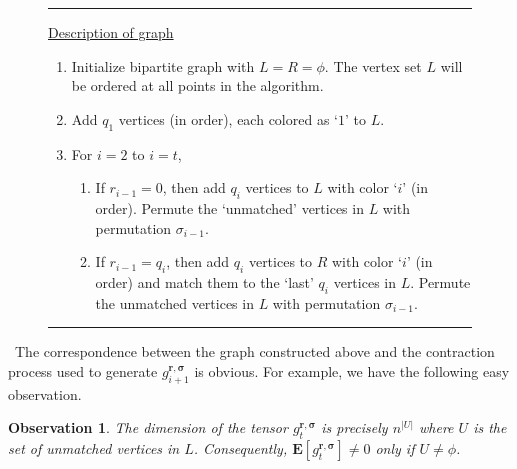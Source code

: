 \documentclass[11pt]{article}
\numberwithin{equation}{section}
\theoremstyle{definition}
\theoremstyle{plain}
\newtheorem{obs}[theorem]{Observation}
\begin{document}
\begin{figure}[htb]
\hrule
\vline
\begin{minipage}[t]{0.98\linewidth}
\vspace{10 pt}
\begin{center}
\begin{minipage}[h]{0.95\linewidth}

%
%
%
%
%
%
%

\vspace{3 pt}
\underline{\textsf{Description of graph}}
\begin{enumerate}
\item Initialize bipartite graph with $L = R = \phi$. The vertex set $L$ will be ordered at all points in the algorithm. 

\item Add $q_1$ vertices (in order), each colored as `$1$' to $L$. 

\item For $i = 2$ to $i = t$, 
\begin{enumerate}
\item If $r_{i-1} =0$, then add $q_i$ vertices to $L$ with color `$i$' (in order). Permute the `unmatched' vertices in $L$ with permutation $\sigma_{i-1}$. 
\item If $r_{i-1} = q_i$, then add $q_i$ vertices to $R$ with color `$i$' (in order) and match them to the `last' $q_i$ vertices in $L$. Permute the unmatched vertices in $L$ with permutation $\sigma_{i-1}$. 
\end{enumerate}
\end{enumerate}

\vspace{5 pt}

\end{minipage}
\end{center}

\end{minipage}
\hfill \vline
\hrule
%
\label{fig:DS}
\end{figure}%
%
%
%
%
%
%
%
%
%
~The correspondence between the graph constructed above and the contraction process used to generate $g^{\mathbf{r}, \boldsymbol{\sigma}}_{i+1}$ is obvious. For example, we have the following easy observation. 
\begin{obs}
The dimension of the tensor $g^{\mathbf{r}, \boldsymbol{\sigma}}_t$ is precisely $n^{|U|}$ where $U$ is the set of unmatched vertices in $L$. Consequently, 
$\mathbf{E}[g^{\mathbf{r}, \boldsymbol{\sigma}}_t] \neq 0$ only if $U \neq  \phi$. 
\end{obs} 
\end{document}
